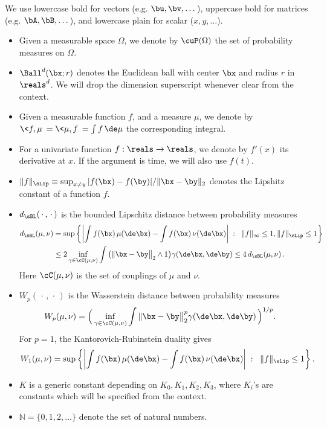 \documentclass[11pt]{article}
\begin{document}
We use lowercase bold for vectors (e.g. $\bu,\bv,\dots$), uppercase bold for matrices (e.g. $\bA, \bB,\dots$),
and lowercase plain for scalar ($x,y,\dots$). 
%
\begin{itemize}
%
\item Given a measurable space $\Omega$, we denote by $\cuP(\Omega)$ the set of probability measures on $\Omega$.
%
\item $\Ball^d(\bx;r)$ denotes the Euclidean ball with center $\bx$ and radius $r$ in $\reals^d$. We will drop the dimension superscript
whenever clear from the context.
%
 \item Given a measurable function $f$, and a measure $\mu$, we denote by $\<f,\mu\> = \<\mu,f\> =\int f\, \de\mu$ the corresponding integral.
%
\item For a univariate function $f:\reals\to\reals$, we denote by $f'(x)$ its derivative at $x$. If the argument is time, we
will also use $\dot{f}(t)$.
%
\item $\|f\|_{\sLip}\equiv \sup_{x\neq y}|f(\bx)-f(\by)|/\|\bx-\by\|_2$ denotes the Lipshitz constant of a function $f$.
%
\item $d_{\sBL}(\,\cdot\,,\,\cdot\,)$ is the bounded Lipschitz distance between probability measures
%
\begin{align}
%
d_{\sBL}(\mu,\nu) &= \sup\left\{\left|\int f (\bx)\, \mu(\de \bx) -\int f(\bx)\,\nu(\de \bx)\right|\;:\;\; \|f\|_{\infty}\le 1, \|f\|_{\sLip}\le 1 \right\} \label{eq:BL_primal}\\
& \le 2 \inf_{\gamma\in \cC(\mu,\nu)}  \int \big(\|\bx-\by\big\|_2\wedge 1 \big) \gamma(\de \bx,\de\by) \le 4 \, d_{\sBL}(\mu, \nu)\, . \label{eq:BL_dual}
%
\end{align}
%
Here  $\cC(\mu,\nu)$ is the set of couplings of $\mu$ and $\nu$.
%
\item $W_p(\,\cdot\,,\,\cdot\,)$ is the Wasserstein distance between probability measures
%
\begin{align}
%
W_p(\mu,\nu) & = \Big(\inf_{\gamma\in \cC(\mu,\nu)}  \int \|\bx-\by\big\|_2 ^p \gamma(\de \bx,\de\by) \,\Big)^{1/p} . \label{eq:Wasserstein_dual}
%
\end{align}
For $p = 1$, the Kantorovich-Rubinstein duality gives
\begin{align}
%
W_1(\mu,\nu) & = \sup\left\{\left|\int f (\bx)\, \mu(\de \bx) -\int f(\bx)\,\nu(\de \bx)\right|\;:\;\; \|f\|_{\sLip}\le 1 \right\}. \label{eq:Wasserstein_primal}
%
\end{align}

\item $K$ is a generic constant depending on $K_0, K_1, K_2, K_3$, where  $K_i$'s are constants which will be specified from the context. 


\item $\mathbb N = \{0, 1, 2, \ldots \}$ denote the set of natural numbers. 

\end{itemize}
\end{document}
